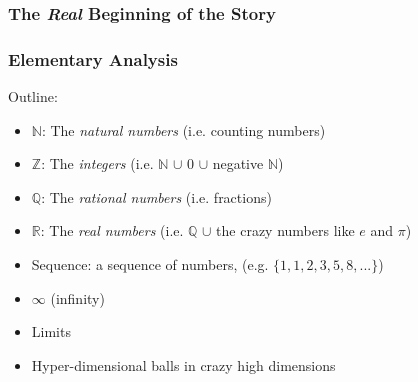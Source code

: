 \documentclass[10pt]{beamer}
\def\R{\mathbb{R}}                     %
\def\N{\mathbb{N}}                     %
\def\Z{\mathbb{Z}}                     %
\def\Q{\mathbb{Q}}                     %
\begin{document}
\begin{frame}
  \frametitle{The \textit{Real} Beginning of the Story}

  \begin{minipage}{4in}
    \centering
    \hspace*{.2in}
  \end{minipage}
\end{frame}


\begin{frame}
  \frametitle{Elementary Analysis}

  Outline:
  \begin{itemize}
  \item $\N$: The \textit{natural numbers} (i.e. counting numbers)
  \item $\Z$: The \textit{integers} (i.e. $\N$ $\cup$ 0 $\cup$ negative $\N$)
  \item $\Q$: The \textit{rational numbers} (i.e. fractions)
  \item $\R$: The \textit{real numbers} (i.e. $\Q$ $\cup$ the crazy numbers like $e$ and $\pi$)
  \item Sequence: a sequence of numbers, (e.g. $\{1, 1, 2, 3, 5, 8, ...\}$)
  \item $\infty$ (infinity)
  \item Limits
  \item Hyper-dimensional balls in crazy high dimensions
  \end{itemize}
\end{frame}
\end{document}
